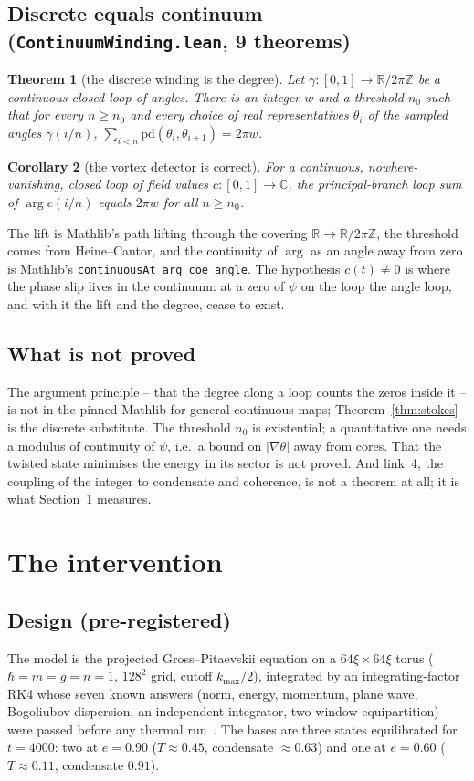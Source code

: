 \documentclass[11pt,a4paper]{article}
\newcommand{\lean}[1]{\texttt{\small #1}}
\newtheorem{theorem}{Theorem}
\newtheorem{corollary}[theorem]{Corollary}
\begin{document}
\subsection{Discrete equals continuum (\lean{ContinuumWinding.lean}, 9 theorems)}

\begin{theorem}[the discrete winding is the degree]\label{thm:rome}
Let $\gamma:[0,1]\to\mathbb R/2\pi\mathbb Z$ be a continuous closed loop of angles. There is an integer
$w$ and a threshold $n_0$ such that for every $n\ge n_0$ and every choice of real representatives
$\theta_i$ of the sampled angles $\gamma(i/n)$, $\sum_{i<n}\mathrm{pd}(\theta_i,\theta_{i+1})=2\pi w$.
\end{theorem}
\begin{corollary}[the vortex detector is correct]
For a continuous, nowhere-vanishing, closed loop of field values $c:[0,1]\to\mathbb C$, the
principal-branch loop sum of $\arg c(i/n)$ equals $2\pi w$ for all $n\ge n_0$.
\end{corollary}
The lift is Mathlib's path lifting through the covering $\mathbb R\to\mathbb R/2\pi\mathbb Z$, the
threshold comes from Heine--Cantor, and the continuity of $\arg$ as an angle away from zero is
Mathlib's \lean{continuousAt\_arg\_coe\_angle}. The hypothesis $c(t)\ne0$ is where the phase slip
lives in the continuum: at a zero of $\psi$ on the loop the angle loop, and with it the lift and the
degree, cease to exist.

\subsection{What is not proved}
The argument principle -- that the degree along a loop counts the zeros inside it -- is not in the
pinned Mathlib for general continuous maps; Theorem~\ref{thm:stokes} is the discrete substitute. The
threshold $n_0$ is existential; a quantitative one needs a modulus of continuity of $\psi$, i.e.\ a
bound on $|\nabla\theta|$ away from cores. That the twisted state minimises the energy in its sector is
not proved. And link~4, the coupling of the integer to condensate and coherence, is not a theorem at
all; it is what Section~\ref{sec:intervention} measures.

\section{The intervention}\label{sec:intervention}

\subsection{Design (pre-registered)}
The model is the projected Gross--Pitaevskii equation on a $64\xi\times64\xi$ torus
($\hbar=m=g=n=1$, $128^2$ grid, cutoff $k_{\max}/2$), integrated by an integrating-factor RK4 whose
seven known answers (norm, energy, momentum, plane wave, Bogoliubov dispersion, an independent
integrator, two-window equipartition) were passed before any thermal run~\cite{SimulaBlakie2006,
FosterBlakieDavis2010}. The bases are three states equilibrated for $t=4000$: two at $e=0.90$
($T\approx0.45$, condensate $\approx0.63$) and one at $e=0.60$ ($T\approx0.11$, condensate $0.91$).
\end{document}
